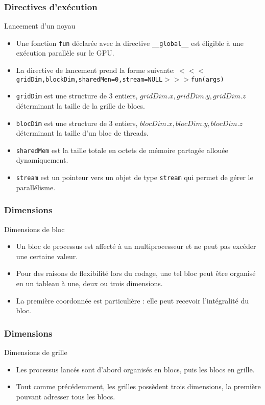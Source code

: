 \begin{frame}
    \frametitle{Directives d'exécution}
\begin{block}{Lancement d'un noyau}
    \begin{itemize}
          \item<+-> Une fonction \texttt{fun} déclarée avec la directive \texttt{\_\_global\_\_} est éligible à une exécution parallèle 
  sur le GPU.
  \item<+-> La directive de lancement prend la forme suivante:
{\footnotesize $<<<$\texttt{gridDim,blockDim,sharedMen=0,stream=NULL}$>>>$\texttt{fun(args)}}
 \item<+-> \texttt{gridDim} est une structure de 3 entiers, $gridDim.x,gridDim.y,gridDim.z$ déterminant la taille de la
 grille de blocs.
  \item<+-> \texttt{blocDim} est une structure de 3 entiers, $blocDim.x,blocDim.y,blocDim.z$ déterminant la taille d'un 
  bloc de threads.
  \item<+-> \texttt{sharedMem} est la taille totale en octets de mémoire partagée allouée dynamiquement. 
  \item<+-> \texttt{stream} est un pointeur vers un objet de type \texttt{stream} qui permet de gérer le parallélisme.

\end{itemize}

\end{block}
\end{frame}
\begin{frame}
    \frametitle{Dimensions}
\begin{block}{Dimensions de bloc}
    \begin{itemize}
          \item<+-> Un bloc de processus est affecté à un multiprocesseur et ne peut pas excéder une
          certaine valeur.
          \item<+-> Pour des raisons de flexibilité lors du codage, une tel bloc peut être organisé en 
          un tableau à une, deux ou trois dimensions. 
          \item<+-> La première coordonnée est particulière : elle peut recevoir l'intégralité du bloc. 
\end{itemize}
\end{block}
\end{frame}
\begin{frame}
    \frametitle{Dimensions}
\begin{block}{Dimensions de grille}
    \begin{itemize}
          \item<+-> Les processus lancés sont d'abord organisés en blocs, puis les blocs en grille.
          \item<+-> Tout comme précédemment, les grilles possèdent trois dimensions, la première pouvant 
          adresser tous les blocs.
\end{itemize}
\end{block}
\end{frame}
